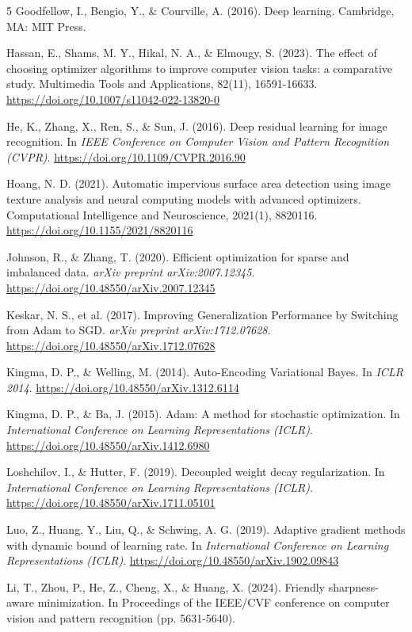 \documentclass{article}
\begin{document}
\begin{thebibliography}{5}
Goodfellow, I., Bengio, Y., \& Courville, A. (2016). Deep learning. Cambridge, MA: MIT Press.

Hassan, E., Shams, M. Y., Hikal, N. A., \& Elmougy, S. (2023). The effect of choosing optimizer algorithms to improve computer vision tasks: a comparative study. Multimedia Tools and Applications, 82(11), 16591-16633. \url{https://doi.org/10.1007/s11042-022-13820-0}

He, K., Zhang, X., Ren, S., \& Sun, J. (2016). Deep residual learning for image recognition. In \textit{IEEE Conference on Computer Vision and Pattern Recognition (CVPR)}. \url{https://doi.org/10.1109/CVPR.2016.90}

Hoang, N. D. (2021). Automatic impervious surface area detection using image texture analysis and neural computing models with advanced optimizers. Computational Intelligence and Neuroscience, 2021(1), 8820116. \url{https://doi.org/10.1155/2021/8820116}

Johnson, R., \& Zhang, T. (2020). Efficient optimization for sparse and imbalanced data. \textit{arXiv preprint arXiv:2007.12345}. \url{https://doi.org/10.48550/arXiv.2007.12345}

Keskar, N. S., et al. (2017). Improving Generalization Performance by Switching from Adam to SGD. \textit{arXiv preprint arXiv:1712.07628}. \url{https://doi.org/10.48550/arXiv.1712.07628}

Kingma, D. P., \& Welling, M. (2014). Auto-Encoding Variational Bayes. In \textit{ICLR 2014}. \url{https://doi.org/10.48550/arXiv.1312.6114}

Kingma, D. P., \& Ba, J. (2015). Adam: A method for stochastic optimization. In \textit{International Conference on Learning Representations (ICLR)}. \url{https://doi.org/10.48550/arXiv.1412.6980}

Loshchilov, I., \& Hutter, F. (2019). Decoupled weight decay regularization. In \textit{International Conference on Learning Representations (ICLR)}. \url{https://doi.org/10.48550/arXiv.1711.05101}

Luo, Z., Huang, Y., Liu, Q., \& Schwing, A. G. (2019). Adaptive gradient methods with dynamic bound of learning rate. In \textit{International Conference on Learning Representations (ICLR)}. \url{https://doi.org/10.48550/arXiv.1902.09843}

Li, T., Zhou, P., He, Z., Cheng, X., \& Huang, X. (2024). Friendly sharpness-aware minimization. In Proceedings of the IEEE/CVF conference on computer vision and pattern recognition (pp. 5631-5640).



\end{thebibliography}
\end{document}
